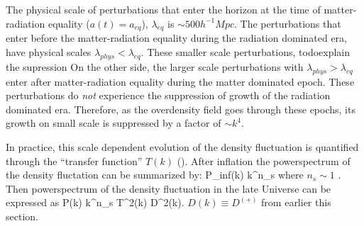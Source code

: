 The physical scale of perturbations that enter the horizon at the time of 
matter-radiation equality ($a(t) = a_{eq}$), $\lambda_{eq}$ is $\sim 500 h^{-1}Mpc$.
The perturbations that enter before the matter-radiation equality during 
the radiation dominated era, have physical scales $\lambda_{phys} < \lambda_{eq}$. 
These smaller scale perturbations, todo{explain the supression} 
On the other side, the larger scale perturbations with $\lambda_{phys} > \lambda_{eq}$
enter after matter-radiation equality during the matter dominated epoch. These 
perturbations do {\em not} experience the suppression of growth of the radiation 
dominated era. Therefore, as the overdensity field goes through these epochs, its 
growth on small scale is suppressed by a factor of $\sim k^4$.  


In practice, this scale dependent evolution of the density fluctuation is 
quantified through the ``transfer function'' $T(k)$ (). After inflation the 
powerspectrum of the density fluctation can be summarized by: 
\beq
P_{\rm inf}(k) \propto k^{n_s}
\eeq
where $n_s \sim 1$ . Then powerspectrum of the density 
fluctuation in the late Universe can be expressed as 
\beq
P(k) \propto k^{n_s} \; T^2(k) \; D^2(k). 
\eeq
$D(k) \equiv D^(+)$ from earlier this section. 

